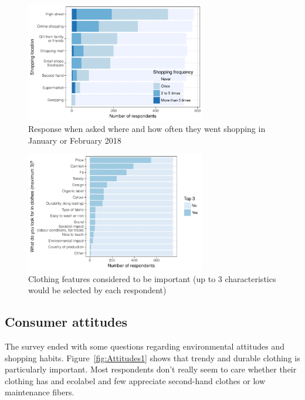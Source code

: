 \documentclass[review]{elsarticle}
\begin{document}
\begin{figure}[ht]
\begin{center}
 \includegraphics[width=0.7\textwidth]{figures/ShopLoc.pdf}
\caption{Response when asked where and how often they went shopping in January or February 2018}\label{fig:ShopLoc}
 \end{center}
\end{figure}
\begin{figure}[ht]
\begin{center}
 \includegraphics[width=0.7\textwidth]{figures/ShopClothing.pdf}
 \caption{Clothing features considered to be important (up to 3 characteristics would be selected by each respondent)}\label{fig:ShopClothing}
 \end{center}
\end{figure}

\subsection{Consumer attitudes}
The survey ended with some questions regarding environmental attitudes and shopping habits. Figure~\ref{fig:Attitudes1} shows that trendy and durable clothing is particularly important. Most respondents don't really seem to care whether their clothing has and ecolabel and few appreciate second-hand clothes or low maintenance fibers.  
\end{document}
